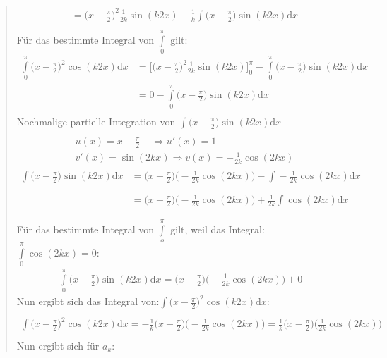 \begin{quote}
\begin{align*}
&=\bigg(x-\frac{\pi}{2}\bigg)^2\frac{1}{2k}\sin(k2x)-\frac{1}{k}\int\limits_{}^{} \bigg(x-\frac{\pi}{2}\bigg)\sin(k2x)\mathrm{d}x
\end{align*}
Für das bestimmte Integral von $ \int\limits_{0}^{\pi}  $ gilt:\\
\begin{align*}
\int\limits_{0}^{\pi}\bigg(x-\frac{\pi}{2}\bigg)^2\cos(k2x)\mathrm{d}x&=\bigg[\bigg(x-\frac{\pi}{2}\bigg)^2\frac{1}{2k}\sin(k2x)\bigg]^\pi_0-\int\limits_{0}^{\pi} \bigg(x-\frac{\pi}{2}\bigg)\sin(k2x)\mathrm{d}x \\
&=0-\int\limits_{0}^{\pi} \bigg(x-\frac{\pi}{2}\bigg)\sin(k2x)\mathrm{d}x \\
\end{align*}
Nochmalige partielle Integration von $\int\limits_{}^{} \big(x-\frac{\pi}{2}\big)\sin(k2x)\mathrm{d}x  $\\
\begin{align*}
&u(x)=x-\frac{\pi}{2}\;\;\;\;\Rightarrow u'(x)=1\\
&v'(x)=\sin(2kx)\Rightarrow v(x)=-\frac{1}{2k}\cos(2kx)
\end{align*}
\begin{align*}
\int\limits_{}^{} \bigg(x-\frac{\pi}{2}\bigg)\sin(k2x)\mathrm{d}x&=\bigg(x-\frac{\pi}{2}\bigg)\bigg(-\frac{1}{2k}\cos(2kx)\bigg)-\int\limits_{}^{}-\frac{1}{2k}\cos(2kx)\mathrm{d} x\\
&=\bigg(x-\frac{\pi}{2}\bigg)\bigg(-\frac{1}{2k}\cos(2kx)\bigg)+\frac{1}{2k}\int\limits_{}^{}\cos(2kx)\mathrm{d} x\\
\end{align*}
Für das bestimmte Integral von $ \int\limits_{o}^{\pi}  $ gilt, weil das Integral: $ \int\limits_{0}^{\pi}\cos(2kx) =0 $:\\
\begin{align*}
\int\limits_{0}^{\pi} \bigg(x-\frac{\pi}{2}\bigg)\sin(k2x)\mathrm{d}x=\bigg(x-\frac{\pi}{2}\bigg)\bigg(-\frac{1}{2k}\cos(2kx)\bigg)+0
\end{align*}
Nun ergibt sich das Integral von:$ \int\limits_{}^{}\big(x-\frac{\pi}{2}\big)^2\cos(k2x)\mathrm{d}x $:\\
\begin{align*}
\int\limits_{}^{}\bigg(x-\frac{\pi}{2}\bigg)^2\cos(k2x)\mathrm{d}x=-\frac{1}{k} \bigg(x-\frac{\pi}{2}\bigg)\bigg(-\frac{1}{2k}\cos(2kx)\bigg)=\frac{1}{k} \bigg(x-\frac{\pi}{2}\bigg)\bigg(\frac{1}{2k}\cos(2kx)\bigg)
\end{align*}
Nun ergibt sich für $ a_k $:\\

\end{quote}

